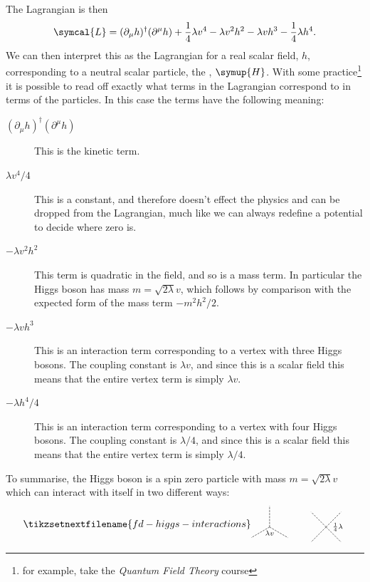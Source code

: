 \documentclass[fleqn]{NotesClass}
\newcommand{\Pparticle}[1]{\symup{#1}}
\newcommand{\Phiggs}{\ensuremath{\Pparticle{H}}}
\newcommand{\course}[1]{\textit{#1}}
\newcommand{\hermit}{\dagger}
\newcommand{\lagrangianDensity}{\symcal{L}}
\begin{document}
    The Lagrangian is then
    \begin{equation}
        \lagrangianDensity = (\partial_\mu h)^\hermit (\partial^\mu h) + \frac{1}{4}\lambda v^4 - \lambda v^2 h^2 - \lambda v h^3 - \frac{1}{4}\lambda h^4.
    \end{equation}
    We can then interpret this as the Lagrangian for a real scalar field, \(h\), corresponding to a neutral scalar particle, the , \(\Phiggs\).
    With some practice\footnote{for example, take the \course{Quantum Field Theory} course} it is possible to read off exactly what terms in the Lagrangian correspond to in terms of the particles.
    In this case the terms have the following meaning:
    \begin{description}
        \item[\((\partial_\mu h)^\hermit (\partial^\mu h)\)] This is the kinetic term.
        \item[\(\lambda v^4/4\)] This is a constant, and therefore doesn't effect the physics and can be dropped from the Lagrangian, much like we can always redefine a potential to decide where zero is.
        \item[\(-\lambda v^2 h^2\)] This term is quadratic in the field, and so is a mass term.
        In particular the Higgs boson has mass \(m = \sqrt{2\lambda} v\), which follows by comparison with the expected form of the mass term \(-m^2 h^2/2\).
        \item[\(-\lambda v h^3\)] This is an interaction term corresponding to a vertex with three Higgs bosons.
        The coupling constant is \(\lambda v\), and since this is a scalar field this means that the entire vertex term is simply \(\lambda v\).
        \item[\(-\lambda h^4/4\)] This is an interaction term corresponding to a vertex with four Higgs bosons.
        The coupling constant is \(\lambda/4\), and since this is a scalar field this means that the entire vertex term is simply \(\lambda/4\).
    \end{description}
    
    To summarise, the Higgs boson is a spin zero particle with mass \(m = \sqrt{2\lambda}v\) which can interact with itself in two different ways:
    \begin{equation}
        \tikzsetnextfilename{fd-higgs-interactions}
        \begin{tikzpicture}[
            scalar/.style={dash pattern=on 2pt off 1pt},
            baseline = {(0, 0)}
            ]
            \draw[scalar] (0, 0) -- (-30:0.75);
            \draw[scalar] (0, 0) -- (210:0.75);
            \draw[scalar] (0, 0) -- (90:0.75);
            \node [below] at (0, 0) {\scriptsize \(\lambda v\)};
            \draw[scalar] (2, 0) -- ++ (45:0.75);
            \draw[scalar] (2, 0) -- ++ (135:0.75);
            \draw[scalar] (2, 0) -- ++ (225:0.75);
            \draw[scalar] (2, 0) -- ++ (315:0.75);
            \node [right] at (2.1, 0) {\scriptsize \(\tfrac{1}{4}\lambda\)};
        \end{tikzpicture}
    \end{equation}
    
\end{document}
